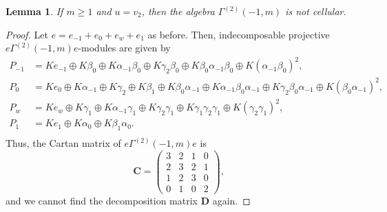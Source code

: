 \documentclass[12pt]{amsart}
\newtheorem{lem}[thm]{Lemma}
\numberwithin{equation}{thm}
\newcommand\bC{\mathbf C}
\newcommand\bD{\mathbf D}
\begin{document}
\begin{lem}\label{D V-3}
If $m\ge1$ and $u=v_2$, then the algebra $\Gamma^{(2)}(-1,m)$ is not cellular.
\end{lem}
\begin{proof}
Let $e=e_{-1}+e_0+e_{w}+e_{1}$ as before. Then, indecomposable projective $e\Gamma^{(2)}(-1,m)e$-modules are given by
\begin{align*}
P_{-1} &= Ke_{-1}\oplus K \beta_{0}\oplus K\alpha_{-1}\beta_{0} \oplus K\gamma_2\beta_0 \oplus K\beta_0\alpha_{-1}\beta_0\oplus K (\alpha_{-1}\beta_0)^2, \\
P_{0} &= Ke_0\oplus K\alpha_{-1}\oplus K\gamma_{2} \oplus K\beta_{1}\oplus K\beta_0\alpha_{-1}\oplus K\alpha_{-1}\beta_0\alpha_{-1}\oplus K\gamma_2\beta_0\alpha_{-1}\oplus K(\beta_0\alpha_{-1})^2, \\
P_{w} &= Ke_{w} \oplus K\gamma_{1}\oplus K\alpha_{-1}\gamma_1\oplus K\gamma_2\gamma_1\oplus K\gamma_1\gamma_2\gamma_1\oplus K(\gamma_2\gamma_1)^2, \\
P_{1} &= Ke_{1} \oplus  K\alpha_{0}\oplus  K\beta_{1}\alpha_{0}. \\
\end{align*}
Thus, the Cartan matrix of $e\Gamma^{(2)}(-1,m)e$ is
\[ \bC=\begin{pmatrix}
3 & 2 & 1 & 0 \\
2 & 3 & 2 & 1 \\
1 & 2 & 3 & 0 \\
0 & 1 & 0 & 2 \end{pmatrix}, \]
and we cannot find the decomposition matrix $\bD$ again. 
\end{proof}
\end{document}
